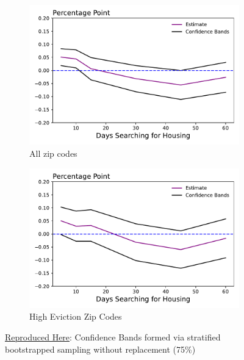 \documentclass[a4paper,12pt]{article}
\begin{document}
\begin{figure}[htbp]
\centering
\begin{subfigure}{.48\textwidth}
    \centering
    \includegraphics[width=.95\linewidth]{figures/rtc/results/cceh/linear_reg_False_False.pdf}
    \caption{All zip codes}
    \label{SUBFIGURE LABEL 3}
\end{subfigure}
\begin{subfigure}{.48\textwidth}
    \centering
    \includegraphics[width=.95\linewidth]{figures/rtc/results/cceh/linear_reg_True_False.pdf}
    \caption{High Eviction Zip Codes}
\label{fig:diff_control_high}
\end{subfigure}
\caption{ \href{https://github.com/pharringtonp19/evictions/blob/main/scripts/cceh/primary/diff_n_mean_rrh.py}{Reproduced Here}: Confidence Bands formed via stratified bootstrapped sampling without replacement (75\%)}
\label{fig:diff_control}
\end{figure}
\end{document}
